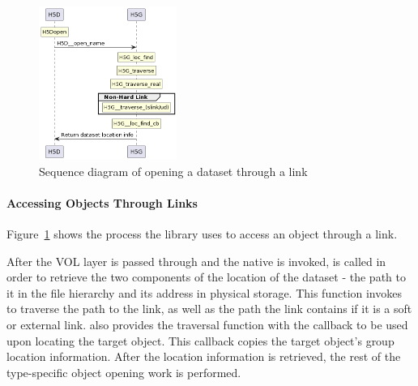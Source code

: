 \begin{figure}
    \centering
    \includegraphics[width=0.40\textwidth]{images/tour_4_uml_link_access.png}
    \caption{Sequence diagram of opening a dataset through a link}
    \label{fig:tour-4-uml-link-access}
\end{figure}

\paragraph{Accessing Objects Through Links} Figure~\ref{fig:tour-4-uml-link-access} shows the process the library uses to access an object through a link.

After the VOL layer is passed through and the native  is invoked,  is called in order to retrieve the two components of the location of the dataset - the path to it in the file hierarchy and its address in physical storage. This function invokes  to traverse the path to the link, as well as the path the link contains if it is a soft or external link.  also provides the traversal function with the  callback to be used upon locating the target object. This callback copies the target object's group location information. After the location information is retrieved, the rest of the type-specific object opening work is performed.

